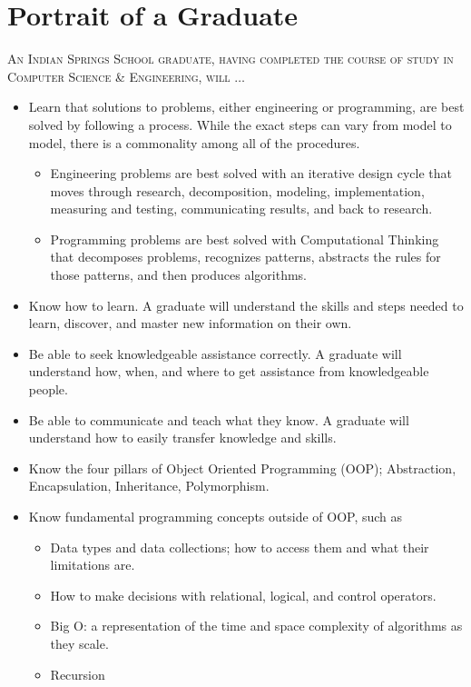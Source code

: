 \section{Portrait of a Graduate}

\textsc{An Indian Springs School graduate, having completed the course of study in Computer Science \& Engineering, will} $\ldots$ 

\begin{itemize}
  \item Learn that solutions to problems, either engineering or programming, are best solved by following a process. While the exact steps can vary from model to model, there is a commonality among all of the procedures. 
  \begin{itemize}
\item Engineering problems are best solved with an iterative design cycle that moves through research, decomposition, modeling, implementation, measuring and testing, communicating results, and back to research.
\item Programming problems are best solved with Computational Thinking that decomposes problems, recognizes patterns, abstracts the rules for those patterns, and then produces algorithms.
\end{itemize}
\item Know how to learn. A graduate will understand the skills and steps needed to learn, discover, and master new information on their own.
\item Be able to seek knowledgeable assistance correctly. A graduate will understand how, when, and where to get assistance from knowledgeable people.
\item Be able to communicate and teach what they know. A graduate will understand how to easily transfer knowledge and skills.
\item Know the four pillars of Object Oriented Programming (OOP); Abstraction, Encapsulation, Inheritance, Polymorphism.
\item Know fundamental programming concepts outside of OOP, such as
\begin{itemize}
\item Data types and data collections; how to access them and what their limitations are.
\item How to make decisions with relational, logical, and control operators. 
\item Big O: a representation of the time and space complexity of algorithms as they scale.
\item Recursion 

\end{itemize}
\end{itemize}
